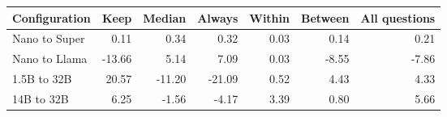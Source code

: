 \begin{tabular}{lrrrrrr}
\toprule
Configuration & Keep & Median & Always & Within & Between & All questions \\
\midrule
Nano to Super & 0.11 & 0.34 & 0.32 & 0.03 & 0.14 & 0.21 \\
Nano to Llama & -13.66 & 5.14 & 7.09 & 0.03 & -8.55 & -7.86 \\
1.5B to 32B & 20.57 & -11.20 & -21.09 & 0.52 & 4.43 & 4.33 \\
14B to 32B & 6.25 & -1.56 & -4.17 & 3.39 & 0.80 & 5.66 \\
\bottomrule
\end{tabular}
